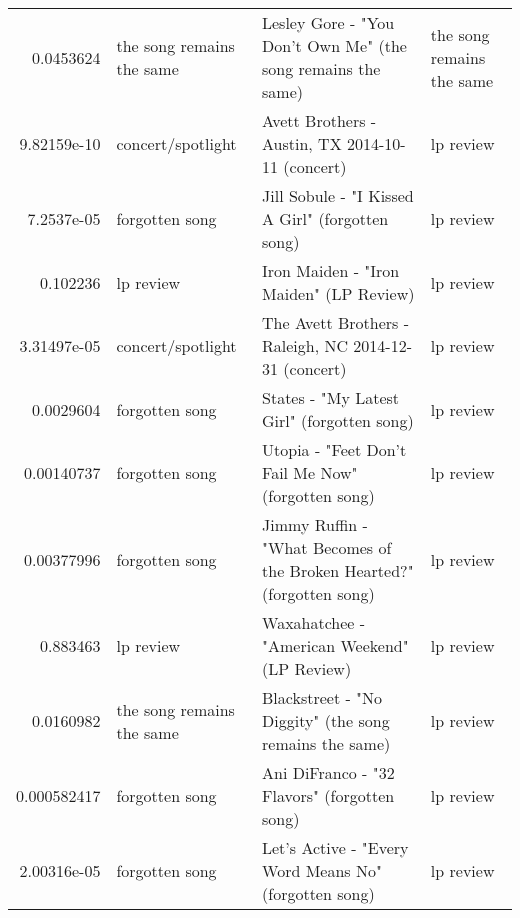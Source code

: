 \documentclass[letterpaper,10pt]{article}
\begin{document}
\begin{table}[H]
\begin{adjustbox}{max width=\linewidth}
\begin{tabular}{rlll}
  0.0453624   & the song remains the same & Lesley Gore - "You Don't Own Me" (the song remains the same)                                                 & the song remains the same \\
  9.82159e-10 & concert/spotlight         & Avett Brothers - Austin, TX 2014-10-11 (concert)                                                             & lp review                 \\
 7.2537e-05  & forgotten song            & Jill Sobule - "I Kissed A Girl" (forgotten song)                                                            & lp review                 \\
  0.102236    & lp review                 & Iron Maiden - "Iron Maiden" (LP Review)                                                                      & lp review                 \\
  3.31497e-05 & concert/spotlight         & The Avett Brothers - Raleigh, NC 2014-12-31 (concert)                                                        & lp review                 \\
  0.0029604   & forgotten song            & States - "My Latest Girl" (forgotten song)                                                                   & lp review                 \\
  0.00140737  & forgotten song            & Utopia - "Feet Don't Fail Me Now" (forgotten song)                                                           & lp review                 \\
  0.00377996  & forgotten song            & Jimmy Ruffin - "What Becomes of the Broken Hearted?" (forgotten song)                                        & lp review                 \\
  0.883463    & lp review                 & Waxahatchee - "American Weekend" (LP Review)                                                                 & lp review                 \\
  0.0160982   & the song remains the same & Blackstreet - "No Diggity" (the song remains the same)                                                       & lp review                 \\
  0.000582417 & forgotten song            & Ani DiFranco - "32 Flavors" (forgotten song)                                                                 & lp review                 \\
  2.00316e-05 & forgotten song            & Let's Active - "Every Word Means No" (forgotten song)                                                        & lp review                 \\

\end{tabular}
\end{adjustbox}
\end{table}
\end{document}
